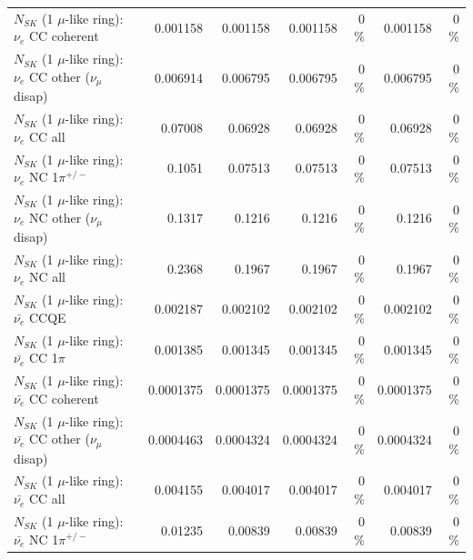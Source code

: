 \begin{table}
\begin{tabular}{| l | r | r | r  r | r  r |}
                               $N_{SK}$ (1 $\mu$-like ring): $\nu_e$ CC coherent &        0.001158 &        0.001158 &        0.001158 &        0 \%  &        0.001158 &        0 \%  \\ 
                $N_{SK}$ (1 $\mu$-like ring): $\nu_e$ CC other ($\nu_\mu$ disap) &        0.006914 &        0.006795 &        0.006795 &        0 \%  &        0.006795 &        0 \%  \\ 
                                  $N_{SK}$ (1 $\mu$-like ring): $\nu_{e}$ CC all &         0.07008 &         0.06928 &         0.06928 &        0 \%  &         0.06928 &        0 \%  \\ 
\hline
                           $N_{SK}$ (1 $\mu$-like ring): $\nu_e$ NC 1$\pi^{+/-}$ &          0.1051 &         0.07513 &         0.07513 &        0 \%  &         0.07513 &        0 \%  \\ 
                $N_{SK}$ (1 $\mu$-like ring): $\nu_e$ NC other ($\nu_\mu$ disap) &          0.1317 &          0.1216 &          0.1216 &        0 \%  &          0.1216 &        0 \%  \\ 
                                  $N_{SK}$ (1 $\mu$-like ring): $\nu_{e}$ NC all &          0.2368 &          0.1967 &          0.1967 &        0 \%  &          0.1967 &        0 \%  \\ 
\hline
\hline
\hline
                                $N_{SK}$ (1 $\mu$-like ring): $\bar{\nu_e}$ CCQE &        0.002187 &        0.002102 &        0.002102 &        0 \%  &        0.002102 &        0 \%  \\ 
                           $N_{SK}$ (1 $\mu$-like ring): $\bar{\nu_e}$ CC 1$\pi$ &        0.001385 &        0.001345 &        0.001345 &        0 \%  &        0.001345 &        0 \%  \\ 
                         $N_{SK}$ (1 $\mu$-like ring): $\bar{\nu_e}$ CC coherent &       0.0001375 &       0.0001375 &       0.0001375 &        0 \%  &       0.0001375 &        0 \%  \\ 
          $N_{SK}$ (1 $\mu$-like ring): $\bar{\nu_e}$ CC other ($\nu_\mu$ disap) &       0.0004463 &       0.0004324 &       0.0004324 &        0 \%  &       0.0004324 &        0 \%  \\ 
                            $N_{SK}$ (1 $\mu$-like ring): $\bar{\nu_{e}}$ CC all &        0.004155 &        0.004017 &        0.004017 &        0 \%  &        0.004017 &        0 \%  \\ 
\hline
                     $N_{SK}$ (1 $\mu$-like ring): $\bar{\nu_e}$ NC 1$\pi^{+/-}$ &         0.01235 &         0.00839 &         0.00839 &        0 \%  &         0.00839 &        0 \%  \\ 

\end{tabular}
\end{table}
